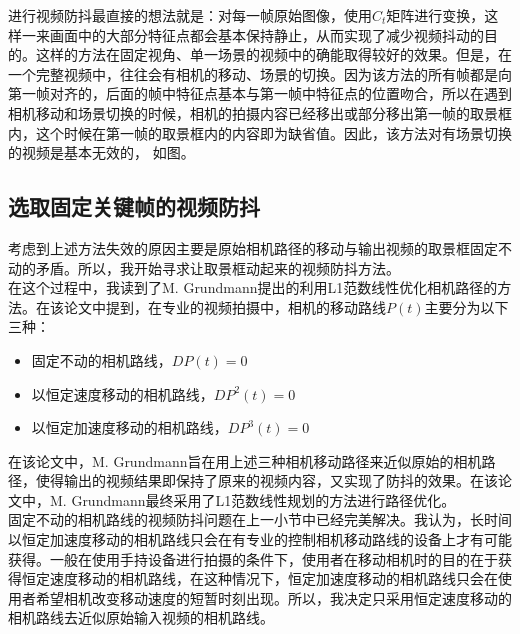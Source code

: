 \documentclass[journal, a4paper]{IEEEtran}
\begin{document}
    进行视频防抖最直接的想法就是：对每一帧原始图像，使用$C_{t}$矩阵进行变换，这样一来画面中的大部分特征点都会基本保持静止，从而实现了减少视频抖动的目的。这样的方法在固定视角、单一场景的视频中的确能取得较好的效果。但是，在一个完整视频中，往往会有相机的移动、场景的切换。因为该方法的所有帧都是向第一帧对齐的，后面的帧中特征点基本与第一帧中特征点的位置吻合，所以在遇到相机移动和场景切换的时候，相机的拍摄内容已经移出或部分移出第一帧的取景框内，这个时候在第一帧的取景框内的内容即为缺省值。因此，该方法对有场景切换的视频是基本无效的， 如图。
    
\subsection{选取固定关键帧的视频防抖}
    考虑到上述方法失效的原因主要是原始相机路径的移动与输出视频的取景框固定不动的矛盾。所以，我开始寻求让取景框动起来的视频防抖方法。 \\
    
    在这个过程中，我读到了M. Grundmann提出的利用L1范数线性优化相机路径的方法\cite{L1Opt}。在该论文中提到，在专业的视频拍摄中，相机的移动路线$P(t)$主要分为以下三种：
    \begin{itemize}
    \item 固定不动的相机路线，$DP(t)=0$
    \item 以恒定速度移动的相机路线，$DP^2(t)=0$
    \item 以恒定加速度移动的相机路线，$DP^3(t)=0$
    \end{itemize}
    在该论文中，M. Grundmann旨在用上述三种相机移动路径来近似原始的相机路径，使得输出的视频结果即保持了原来的视频内容，又实现了防抖的效果。在该论文中，M. Grundmann最终采用了L1范数线性规划的方法进行路径优化。\\
    
    固定不动的相机路线的视频防抖问题在上一小节中已经完美解决。我认为，长时间以恒定加速度移动的相机路线只会在有专业的控制相机移动路线的设备上才有可能获得。一般在使用手持设备进行拍摄的条件下，使用者在移动相机时的目的在于获得恒定速度移动的相机路线，在这种情况下，恒定加速度移动的相机路线只会在使用者希望相机改变移动速度的短暂时刻出现。所以，我决定只采用恒定速度移动的相机路线去近似原始输入视频的相机路线。\\
    
\end{document}
